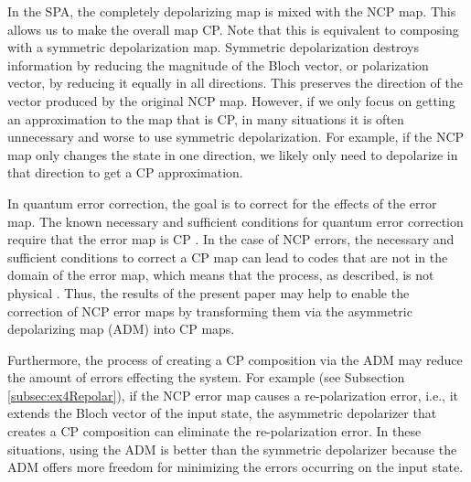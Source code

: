 \documentclass[12pt]{iopart}
\begin{document}
In the SPA, the completely depolarizing map is mixed with the NCP map. This allows us to make the overall map CP. Note that this is equivalent to composing with a symmetric depolarization map. Symmetric depolarization destroys information by reducing the magnitude of the Bloch vector, or polarization vector, by reducing it equally in all directions.  This preserves the direction of the vector produced by the original NCP map. However, if we only focus on getting an approximation to the map that is CP, in many situations it is often unnecessary and worse to use symmetric depolarization. For example, if the NCP map only changes the state in one direction, we likely only need to depolarize in that direction to get a CP approximation. %


In quantum error correction, the goal is to correct for the effects of the error map. The known necessary and sufficient conditions for quantum error correction require that the error map is CP \cite{knill_1997TheoryOfQECC, bennett_1996MixedStateEntAndQEC}. In the case of NCP errors, the necessary and sufficient conditions to correct a CP map can lead to codes that are not in the domain of the error map, which means that the process, as described, is not physical \cite{gonzales2020sufficientCondAndConsForRevGenQuant}. Thus, the results of the present paper may help to enable the correction of NCP error maps by transforming them via the asymmetric depolarizing map (ADM) into CP maps.



Furthermore, the process of creating a CP composition via the ADM may reduce the amount of errors effecting the system. For example (see Subsection \ref{subsec:ex4Repolar}), if the NCP error map causes a re-polarization error, i.e., it extends the Bloch vector of the input state, the asymmetric depolarizer that creates a CP composition can eliminate the re-polarization error. In these situations, using the ADM is better than the symmetric depolarizer because the ADM offers more freedom for minimizing the errors occurring on the input state.
\end{document}
